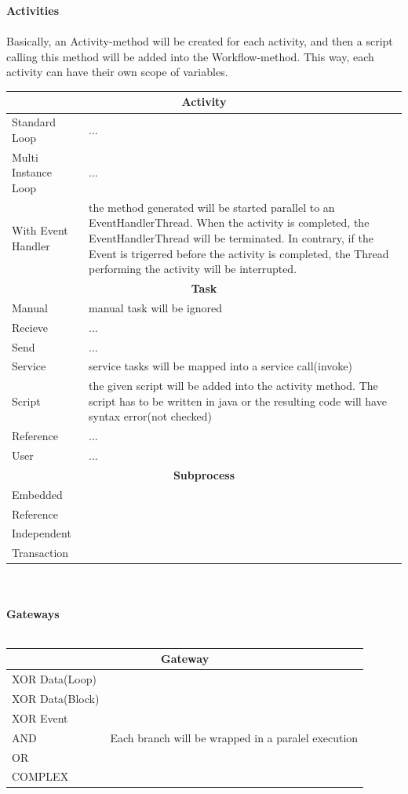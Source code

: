 \textbf{\large{Activities}}\\\\
Basically, an Activity-method will be created for each activity, and then a script calling this method will be added into the Workflow-method. This way, each activity can have their own scope of variables. 
	
		\begin{tabularx}{\linewidth}{|l|X|}\hline\hline
			\multicolumn{2}{|c|}{\textbf{Activity}}\\\hline\hline
			 Standard Loop & ... \\\hline
			 Multi Instance Loop & ... \\\hline
			 With Event Handler & the method generated will be started parallel to an EventHandlerThread. When the activity is completed, the EventHandlerThread will be terminated. In contrary, if the Event is trigerred before the activity is completed, the Thread performing the activity will be interrupted. \\\hline\hline	
				\multicolumn{2}{|c|}{\textbf{Task}}\\\hline\hline
					Manual & manual task will be ignored\\\hline
			 		Recieve & ...\\\hline
			 		Send & ...\\\hline
			 		Service & service tasks will be mapped into a service call(invoke)\\\hline
					Script & the given script will be added into the activity method. The script has to be written in java or the resulting code will have syntax error(not checked)\\\hline
			 		Reference & ... \\\hline
			 		User & ...\\\hline\hline
			 \multicolumn{2}{|c|}{\textbf{Subprocess}} \\\hline\hline
			 		Embedded & \\\hline
			 		Reference & \\\hline
					Independent & \\\hline
					Transaction & \\\hline\hline
		\end{tabularx}\\\\
		
	\textbf{\Large{Gateways}}\\\\
		\begin{tabularx}{\linewidth}{|l|X|}\hline\hline
		\multicolumn{2}{|c|}{\textbf{Gateway}}\\\hline\hline
		XOR Data(Loop) & \\\hline
		XOR Data(Block) & \\\hline
		XOR Event & \\\hline
		AND & Each branch will be wrapped in a paralel execution\\\hline
		OR & \\\hline
		COMPLEX & \\\hline\hline
		\end{tabularx}\\\\
		
